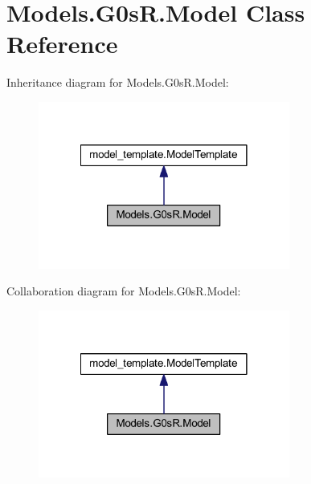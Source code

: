 \hypertarget{class_models_1_1_g0s_r_1_1_model}{\section{Models.\-G0s\-R.\-Model Class Reference}
\label{class_models_1_1_g0s_r_1_1_model}
}


Inheritance diagram for Models.\-G0s\-R.\-Model\-:
\nopagebreak
\begin{figure}[H]
\begin{center}
\leavevmode
\includegraphics[width=234pt]{class_models_1_1_g0s_r_1_1_model__inherit__graph}
\end{center}
\end{figure}


Collaboration diagram for Models.\-G0s\-R.\-Model\-:
\nopagebreak
\begin{figure}[H]
\begin{center}
\leavevmode
\includegraphics[width=234pt]{class_models_1_1_g0s_r_1_1_model__coll__graph}
\end{center}
\end{figure}
